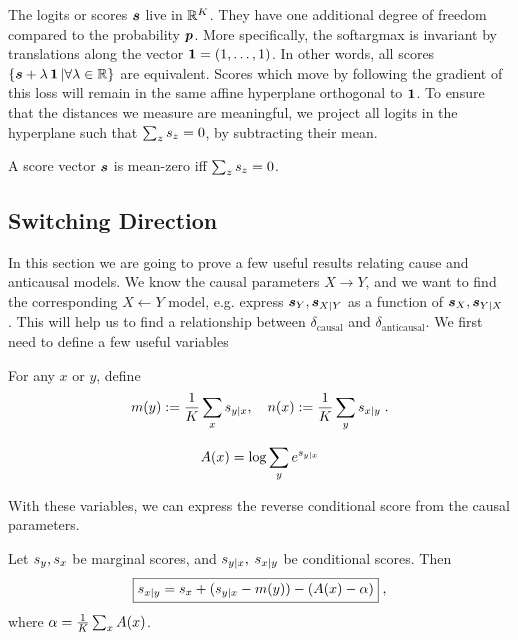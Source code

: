 \begin{subappendices}
The logits or scores ${\bm{s}}$ live in $\mathbb{R}^K$.
They have one additional degree of freedom compared to the probability ${\bm{p}}$. 
More specifically, the softargmax is invariant by translations along the vector $\operatorname{\mathbf{1}} = (1,\dots, 1)$.
In other words, all scores $\{ {\bm{s}} + \lambda \operatorname{\mathbf{1}} | \forall \lambda \in \mathbb{R} \}$ are equivalent. 
Scores which move by following the gradient of this loss will remain in the same affine hyperplane orthogonal to $\operatorname{\mathbf{1}}$.
To ensure that the distances we measure are meaningful, we project all logits in the hyperplane such that $\sum_z {s}_z = 0$, by subtracting their mean.
\begin{definition}
\label{def:mean_zero}
A score vector ${\bm{s}}$ is mean-zero iff $\sum_z {s}_z = 0$.
\end{definition}


\subsection{Switching Direction}
In this section we are going to prove a few useful results relating cause and anticausal models.
We know the causal parameters $X \rightarrow Y$, and we want to find the corresponding $X \leftarrow Y$ model,
e.g. express ${\bm{s}}_Y, {\bm{s}}_{X|Y}$ as a function of ${\bm{s}}_X, {\bm{s}}_{Y|X}$ .
This will help us to find a relationship between $\delta_\text{causal}$ and $\delta_\text{anticausal}$.
We first need to define a few useful variables
\begin{definition}
\label{def:average_conditional_logit}
For any $x$ or $y$, define
\begin{align}
    m(y):= \frac{1}{K} \sum_x {s}_{y|x}, \quad
    n(x):= \frac{1}{K} \sum_y {s}_{x|y} \; .
\end{align}
\end{definition}
\begin{definition}
    \begin{align}
        A(x) = \log \sum_y e^{{s}_{y|x}}
    \end{align}
\end{definition}
With these variables, we can express the reverse conditional score from the causal parameters.
\begin{lemma}
\label{lem:categorical_reverse}
Let ${s}_{y},{s}_{x}$ be marginal scores, 
and ${s}_{y|x},$ ${s}_{x|y}$ be conditional scores. Then
\begin{equation}
    \label{eq:bayes_scores}
    \boxed{{s}_{x|y} = {s}_x + ({s}_{y|x} - m(y)) - (A(x) - \alpha)} \; ,
\end{equation}
where $\alpha = \frac{1}{K} \sum_x A(x)$.
\end{lemma}


\end{subappendices}
